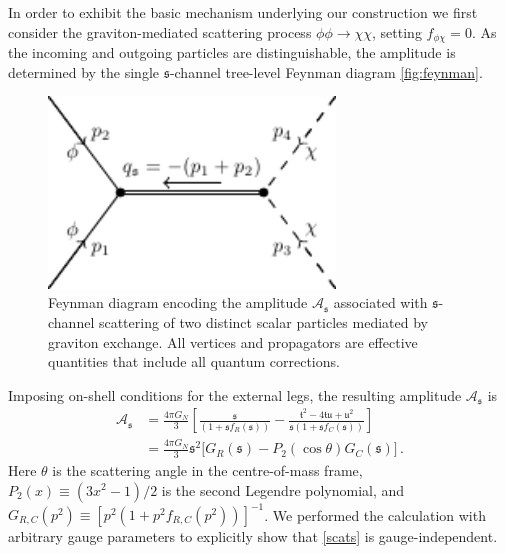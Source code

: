 \documentclass[aps,prl,onecolumn,superscriptaddress,longbibliography,nofootinbib,floatfix,showpacs,12pt]{revtex4-1}
\newcommand{\cA}{{\mathcal A}}
\newcommand{\mans}{\ensuremath{\mathfrak{s}}}
\newcommand{\mant}{\ensuremath{\mathfrak{t}}}
\newcommand{\manu}{\ensuremath{\mathfrak{u}}}
\begin{document}
In order to exhibit the basic mechanism underlying our construction we first consider the graviton-mediated scattering process $\phi\phi \to \chi\chi$, setting $f_{\phi\chi} = 0$.
As the incoming and outgoing particles are distinguishable, the amplitude is determined by the single $\mans$-channel tree-level Feynman diagram \autoref{fig:feynman}.
%
\begin{figure}
	\includegraphics[width=3in]{s_channel_two_fields_with_field_labels}
	\caption{Feynman diagram encoding the amplitude $\mathcal{A}_\mans$ associated with $\mans$-channel scattering of two distinct scalar particles mediated by graviton exchange. All vertices and propagators are effective quantities that include all quantum corrections.}
	\label{fig:feynman}
\end{figure}
%
Imposing on-shell conditions for the external legs, the resulting amplitude $\cA_\mans$ is
%
\begin{equation}\label{scats}
\begin{aligned}
\mathcal{A}_\mans & = 
\frac{4\pi G_N}{3}	\left[
\frac{\mans}{(1+ \mans f_R(\mans))} - \frac{\mant^2-4 \mant \manu + \manu^2}{\mans (1+\mans f_C(\mans))}
\right]
\\ 
& =
\frac{4\pi G_N}{3} \mans^2	\bigg[
 G_R(\mans) -	P_2(\cos\theta) G_C(\mans)
\bigg] \, .
\end{aligned}
\end{equation}
%
Here $\theta$ is the scattering angle in the centre-of-mass frame, $P_2(x) \equiv (3x^2-1)/2$ is the second Legendre polynomial, and $G_{R,C}(p^2) \equiv [p^2 (1+p^2 f_{R,C}(p^2))]^{-1}$.
We performed the  calculation with arbitrary gauge parameters to explicitly show that \eqref{scats} is gauge-independent.
\end{document}
